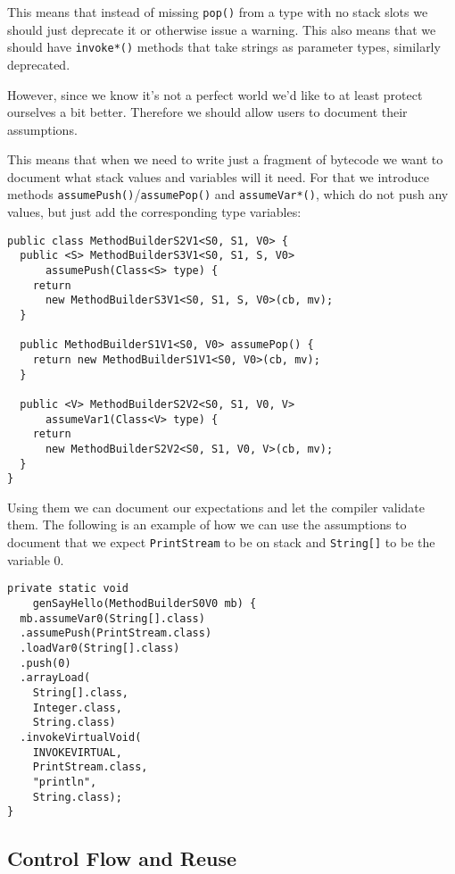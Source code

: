 \documentclass{sig-alternate}
\begin{document}
This means that instead of missing \verb!pop()! from a type with no stack slots we should just deprecate it or otherwise issue a warning. This also means that we should have \verb!invoke*()! methods that take strings as parameter types, similarly deprecated.

However, since we know it's not a perfect world we'd like to at least protect ourselves a bit better. Therefore we should allow users to document their assumptions.

This means that when we need to write just a fragment of bytecode we want to document what stack values and variables will it need. For that we introduce methods \verb!assumePush()!/\verb!assumePop()! and \verb!assumeVar*()!, which do not push any values, but just add the corresponding type variables:

\begin{verbatim}
public class MethodBuilderS2V1<S0, S1, V0> {
  public <S> MethodBuilderS3V1<S0, S1, S, V0> 
      assumePush(Class<S> type) {
    return 
      new MethodBuilderS3V1<S0, S1, S, V0>(cb, mv);
  }

  public MethodBuilderS1V1<S0, V0> assumePop() {
    return new MethodBuilderS1V1<S0, V0>(cb, mv);
  }

  public <V> MethodBuilderS2V2<S0, S1, V0, V> 
      assumeVar1(Class<V> type) {
    return 
      new MethodBuilderS2V2<S0, S1, V0, V>(cb, mv);
  }  
}	
\end{verbatim}

Using them we can document our expectations and let the compiler validate them. The following is an example of how we can use the assumptions to document that we expect \verb!PrintStream! to be on stack and \verb!String[]! to be the variable $0$.

\begin{verbatim}
private static void 
    genSayHello(MethodBuilderS0V0 mb) {
  mb.assumeVar0(String[].class)
  .assumePush(PrintStream.class)
  .loadVar0(String[].class)
  .push(0)
  .arrayLoad(
    String[].class, 
    Integer.class,
    String.class)
  .invokeVirtualVoid(
    INVOKEVIRTUAL, 
    PrintStream.class, 
    "println", 
    String.class);
}
\end{verbatim}

\subsection{Control Flow and Reuse}
\end{document}
